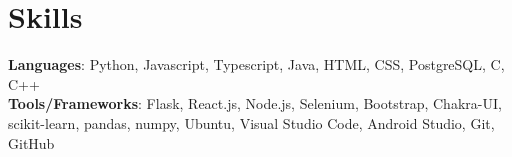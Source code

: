 \documentclass[letterpaper,11pt]{article}
\begin{document}
\section{ Skills}
\begin{itemize}[leftmargin=0.15in, label={}]
    \small{\item{
        \textbf{Languages}{: Python, Javascript, Typescript, Java, HTML, CSS, PostgreSQL, C, C++} \\
        \textbf{Tools/Frameworks}{: Flask, React.js, Node.js, Selenium, Bootstrap, Chakra-UI, scikit-learn, pandas, numpy, Ubuntu, Visual Studio Code, Android Studio, Git, GitHub} \\
        }}
              
\end{itemize}
\vspace{-16pt}
\end{document}
